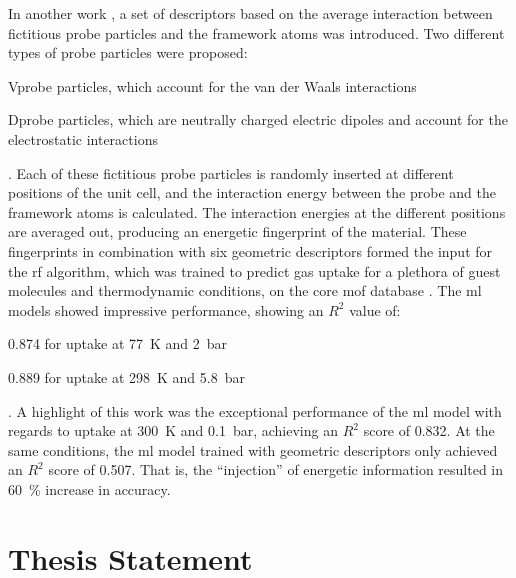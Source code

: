 In another work \parencite{generic}, a set of descriptors based on the average
interaction between fictitious probe particles and the
framework atoms was introduced. Two different types of probe particles were
proposed:
\begin{enumerate*}[label=\roman*).]
	\item Vprobe particles, which account for the van der Waals
		interactions
	\item Dprobe particles, which are neutrally charged electric dipoles and
		account for the electrostatic interactions
\end{enumerate*}.
Each of these fictitious probe particles is randomly inserted at different
positions of the unit cell, and the interaction energy between
the probe and the framework atoms is calculated. The interaction energies at the
different positions are averaged out, producing an energetic
fingerprint of the material. These fingerprints in
combination with six geometric descriptors formed the input for the
\gls{rf} algorithm, which was trained to predict gas
uptake for a plethora of guest molecules
and thermodynamic conditions, on the
\gls{core} \gls{mof} database \parencite{chong47}. The
\gls{ml} models showed impressive performance, showing an $R^2$ value of:
\begin{enumerate*}[label=\roman*).]
	\item \num{0.874} for  uptake at \SI{77}{\kelvin} and \SI{2}{\bar}
	\item \num{0.889} for  uptake at \SI{298}{\kelvin} and
		\SI{5.8}{\bar}
\end{enumerate*}.
A highlight of this work was the exceptional performance of the \gls{ml} model
with regards to  uptake at \SI{300}{\kelvin} and \SI{0.1}{\bar},
achieving an $R^2$ score of \num{0.832}. At the same conditions, the \gls{ml}
model trained with geometric descriptors only achieved an $R^2$ score of
\num{0.507}. That is, the ``injection'' of energetic information resulted in
\SI{60}{\percent} increase in accuracy.

\section{Thesis Statement}

